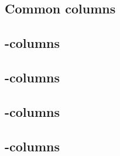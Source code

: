\subsection{Common columns}            
\subsection{\computation{}-columns}    
\subsection{\macro{}-columns}          
\subsection{\extern{}-columns}         
\subsection{\utils{}-columns}          
